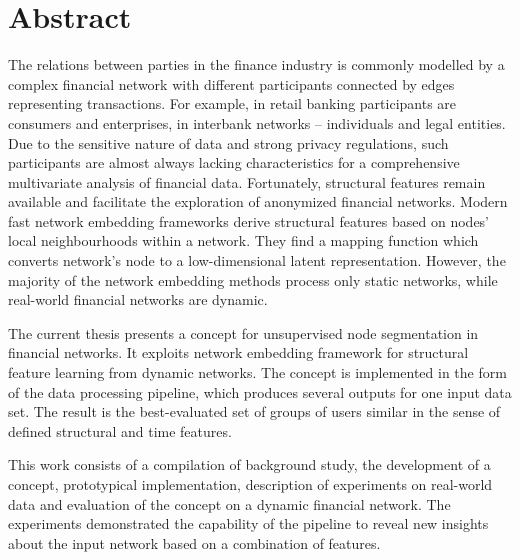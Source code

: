 \chapter*{Abstract}
\label{cha:abstract}

The relations between parties in the finance industry is commonly modelled by a complex financial network with different participants connected by edges representing transactions. For example, in retail banking participants are consumers and enterprises, in interbank networks – individuals and legal entities. Due to the sensitive nature of data and strong privacy regulations, such participants are almost always lacking characteristics for a comprehensive multivariate analysis of financial data. Fortunately, structural features remain available and facilitate the exploration of anonymized financial networks. Modern fast network embedding frameworks derive structural features based on nodes' local neighbourhoods within a network. They find a mapping function which converts network's node to a low-dimensional latent representation. However, the majority of the network embedding methods process only static networks, while real-world financial networks are dynamic.

The current thesis presents a concept for unsupervised node segmentation in financial networks. It exploits network embedding framework for structural feature learning from dynamic networks. The concept is implemented in the form of the data processing pipeline, which produces several outputs for one input data set. The result is the best-evaluated set of groups of users similar in the sense of defined structural and time features.

This work consists of a compilation of background study, the development of a concept, prototypical implementation, description of experiments on real-world data and evaluation of the concept on a dynamic financial network. The experiments demonstrated the capability of the pipeline to reveal new insights about the input network based on a combination of features.